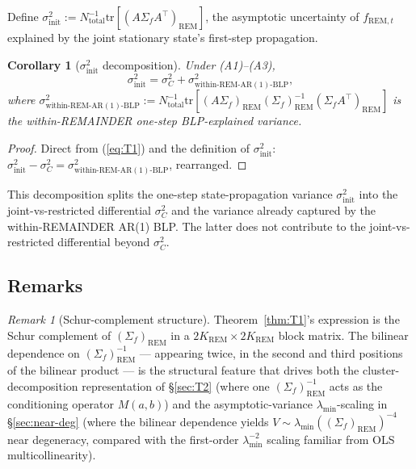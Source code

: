 \documentclass[11pt,letterpaper]{article}
\newtheorem{corollary}{Corollary}
\theoremstyle{remark}
\newtheorem{remark}{Remark}
\newcommand{\REM}{\mathrm{REM}}
\newcommand{\Ntot}{N_{\mathrm{total}}}
\newcommand{\trace}{\mathrm{tr}}
\begin{document}
Define $\sigma^2_{\mathrm{init}} := \Ntot^{-1} \trace[(A \Sigma_f A^\top)_\REM]$, the asymptotic uncertainty of $f_{\REM, t}$ explained by the joint stationary state's first-step propagation.

\begin{corollary}[$\sigma^2_{\mathrm{init}}$ decomposition]\label{cor:sigma-init}
Under (A1)--(A3),
\begin{equation*}
\sigma^2_{\mathrm{init}} = \sigma^2_C + \sigma^2_{\mathrm{within\text{-}REM\text{-}AR(1)\text{-}BLP}},
\end{equation*}
where $\sigma^2_{\mathrm{within\text{-}REM\text{-}AR(1)\text{-}BLP}} := \Ntot^{-1} \trace[(A \Sigma_f)_\REM (\Sigma_f)_\REM^{-1} (\Sigma_f A^\top)_\REM]$ is the within-REMAINDER one-step BLP-explained variance.
\end{corollary}

\begin{proof}
Direct from (\ref{eq:T1}) and the definition of $\sigma^2_{\mathrm{init}}$: $\sigma^2_{\mathrm{init}} - \sigma^2_C = \sigma^2_{\mathrm{within\text{-}REM\text{-}AR(1)\text{-}BLP}}$, rearranged.
\end{proof}

This decomposition splits the one-step state-propagation variance $\sigma^2_{\mathrm{init}}$ into the joint-vs-restricted differential $\sigma^2_C$ and the variance already captured by the within-REMAINDER AR(1) BLP. The latter does not contribute to the joint-vs-restricted differential beyond $\sigma^2_C$.

\subsection{Remarks}

\begin{remark}[Schur-complement structure]\label{rem:schur}
Theorem~\ref{thm:T1}'s expression is the Schur complement of $(\Sigma_f)_\REM$ in a $2K_\REM \times 2K_\REM$ block matrix. The bilinear dependence on $(\Sigma_f)_\REM^{-1}$ --- appearing twice, in the second and third positions of the bilinear product --- is the structural feature that drives both the cluster-decomposition representation of \S\ref{sec:T2} (where one $(\Sigma_f)_\REM^{-1}$ acts as the conditioning operator $M(a, b)$) and the asymptotic-variance $\lambda_{\min}$-scaling in \S\ref{sec:near-deg} (where the bilinear dependence yields $V \sim \lambda_{\min}((\Sigma_f)_\REM)^{-4}$ near degeneracy, compared with the first-order $\lambda_{\min}^{-2}$ scaling familiar from OLS multicollinearity).
\end{remark}
\end{document}
